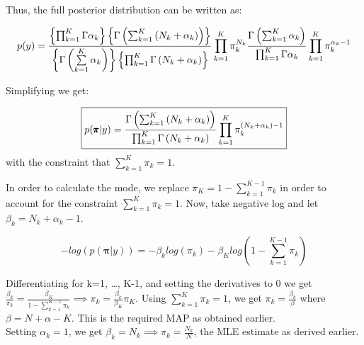 \documentclass[a4paper,12pt]{article}
\begin{document}
\begin{mlsolution}
Thus, the full posterior distribution can be written as:

\begin{equation*}
    p(y) = \frac{\left\{{\prod_{k=1}^K \Gamma\alpha_k}\right\} \left\{{\Gamma\left({\sum_{k=1}^K\left({N_k+\alpha_k}\right)}\right)}\right\}}{\left\{{\Gamma\left({\sum\limits_{k=1}^K\alpha_k}\right)}\right\}\left\{{\prod_{k=1}^K \Gamma\left({N_k+\alpha_k}\right)}\right\}} \prod\limits_{k=1}^K \pi_k^{N_k} \frac{\Gamma\left({\sum_{k=1}^K\alpha_k}\right)}{\prod_{k=1}^K \Gamma\alpha_k} \prod\limits_{k=1}^K \pi_k^{\alpha_k-1}
\end{equation*}

Simplifying we get:

\begin{equation*}
    \boxed
    {
       p(\pmb{\pi}|y) = \frac{\Gamma\left({\sum_{k=1}^K\left({N_k+\alpha_k}\right)}\right)}{\prod_{k=1}^K \Gamma\left({N_k+\alpha_k}\right)} \prod\limits_{k=1}^K \pi_k^{\left({N_k+\alpha_k}\right)-1}
    }
\end{equation*}
with the constraint that $\sum_{k=1}^K \pi_k = 1$.

\begin{center}
    \noindent{}
\end{center}

In order to calculate the mode, we replace $\pi_K = 1 - \sum_{k=1}^{K-1} \pi_k$ in order to account for the constraint $\sum_{k=1}^{K} \pi_k = 1$. Now, take negative log and let $\beta_k = N_k + \alpha_k - 1$.

\begin{equation*}
    -log(p(\pmb{\pi} | y)) = -\beta_klog(\pi_k) - \beta_Klog(1-\sum_{k=1}^{K-1}\pi_k)
\end{equation*}

Differentiating for k=1, \dots, K-1, and setting the derivatives to 0 we get $\frac{\beta_k}{\pi_k}=\frac{\beta_K}{1-\sum_{k=1}^{K-1} \pi_k} \implies \pi_k = \frac{\beta_k}{\beta_K}\pi_K$. Using $\sum_{k=1}^{K} \pi_k = 1$, we get $\pi_k = \frac{\beta_k}{\beta}$ where $\beta = N + \alpha - K$. This is the required MAP as obtained earlier.\\

Setting $\alpha_k = 1$, we get $\beta_k = N_k \implies \pi_k = \frac{N_k}{N}$, the MLE estimate as derived earlier.

\end{mlsolution}
\end{document}
